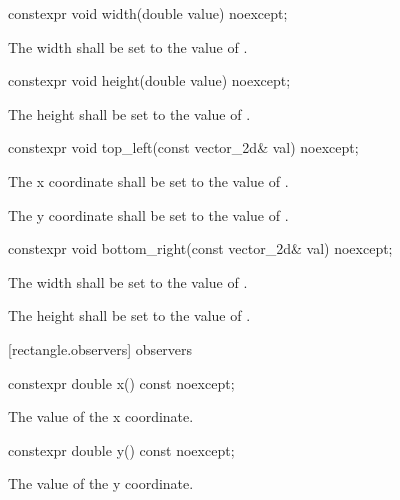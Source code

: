 \begin{itemdecl}
constexpr void width(double value) noexcept;
\end{itemdecl}
\begin{itemdescr}
\pnum
\effects
The width shall be set to the value of .
\end{itemdescr}

\begin{itemdecl}
constexpr void height(double value) noexcept;
\end{itemdecl}
\begin{itemdescr}
\pnum
\effects
The height shall be set to the value of .
\end{itemdescr}

\begin{itemdecl}
constexpr void top_left(const vector_2d& val) noexcept;
\end{itemdecl}
\begin{itemdescr}
\pnum
\effects
The x coordinate shall be set to the value of .

\effects
The y coordinate shall be set to the value of .
\end{itemdescr}

\begin{itemdecl}
constexpr void bottom_right(const vector_2d& val) noexcept;
\end{itemdecl}
\begin{itemdescr}
\pnum
\effects
The width shall be set to the value of .

\pnum
The height shall be set to the value of .
\end{itemdescr}

 [rectangle.observers]{ observers}

\begin{itemdecl}
constexpr double x() const noexcept;
\end{itemdecl}
\begin{itemdescr}
\pnum
\returns
The value of the x coordinate.
\end{itemdescr}

\begin{itemdecl}
constexpr double y() const noexcept;
\end{itemdecl}
\begin{itemdescr}
\pnum
\returns
The value of the y coordinate.
\end{itemdescr}

